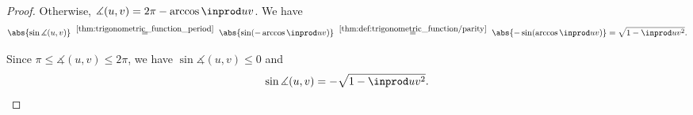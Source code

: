 \begin{proof}
  Otherwise, \( \measuredangle(u, v) = 2\pi - \arccos \inprod u v \). We have
  \begin{equation*}
    \abs{\sin \measuredangle(u, v)}
    \reloset{\ref{thm:trigonometric_function_period}} =
    \abs{\sin(-\arccos \inprod u v)}
    \reloset{\ref{thm:def:trigonometric_function/parity}} =
    \abs{-\sin(\arccos \inprod u v)}
    =
    \sqrt{1 - \inprod u v^2}.
  \end{equation*}

  Since \( \pi \leq \measuredangle(u, v) \leq 2\pi \), we have \( \sin \measuredangle(u, v) \leq 0 \) and
  \begin{equation*}
    \sin \measuredangle(u, v) = -\sqrt{1 - \inprod u v^2}.
  \end{equation*}
\end{proof}


